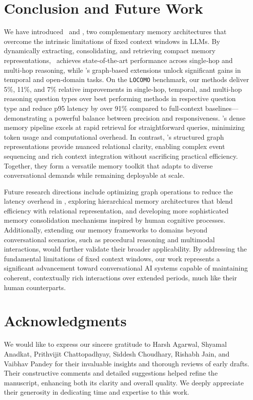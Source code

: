 \section{Conclusion and Future Work}
\label{sec:conclusion}

We have introduced \mem~and \memp, two complementary memory architectures that overcome the intrinsic limitations of fixed context windows in LLMs. By dynamically extracting, consolidating, and retrieving compact memory representations, \mem~achieves state-of-the-art performance across single‑hop and multi‑hop reasoning, while \memp’s graph‑based extensions unlock significant gains in temporal and open‑domain tasks. On the \texttt{LOCOMO} benchmark, our methods deliver 5\%, 11\%, and 7\% relative improvements in single-hop, temporal, and multi-hop reasoning question types over best performing methods in respective question type and reduce p95 latency by over 91\% compared to full‑context baselines—demonstrating a powerful balance between precision and responsiveness. \mem’s dense memory pipeline excels at rapid retrieval for straightforward queries, minimizing token usage and computational overhead. In contrast, \memp’s structured graph representations provide nuanced relational clarity, enabling complex event sequencing and rich context integration without sacrificing practical efficiency. Together, they form a versatile memory toolkit that adapts to diverse conversational demands while remaining deployable at scale.

Future research directions include optimizing graph operations to reduce the latency overhead in \memp, exploring hierarchical memory architectures that blend efficiency with relational representation, and developing more sophisticated memory consolidation mechanisms inspired by human cognitive processes. Additionally, extending our memory frameworks to domains beyond conversational scenarios, such as procedural reasoning and multimodal interactions, would further validate their broader applicability. By addressing the fundamental limitations of fixed context windows, our work represents a significant advancement toward conversational AI systems capable of maintaining coherent, contextually rich interactions over extended periods, much like their human counterparts.


\section{Acknowledgments}
We would like to express our sincere gratitude to Harsh Agarwal, Shyamal Anadkat, Prithvijit Chattopadhyay, Siddesh Choudhary, Rishabh Jain, and Vaibhav Pandey for their invaluable insights and thorough reviews of early drafts. Their constructive comments and detailed suggestions helped refine the manuscript, enhancing both its clarity and overall quality. We deeply appreciate their generosity in dedicating time and expertise to this work.


